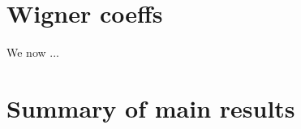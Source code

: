 \documentclass[12pt]{article}
\begin{document}
\section{Wigner coeffs}

\label{MEs}
We now ...

\section{Summary of main results} 
\label{resultsum}




%
%
%
%
%
%
%
%
\end{document}
